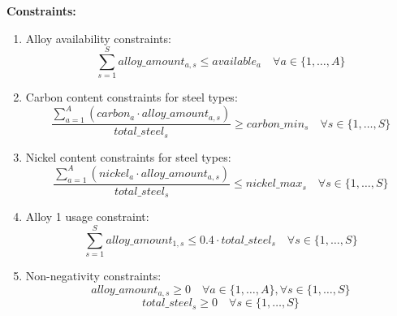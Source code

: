 \documentclass{article}
\begin{document}
\textbf{Constraints:}
\begin{enumerate}
    \item Alloy availability constraints:
    \[
    \sum_{s=1}^{S} alloy\_amount_{a,s} \leq available_{a} \quad \forall a \in \{1,\ldots,A\}
    \]
    
    \item Carbon content constraints for steel types:
    \[
    \frac{\sum_{a=1}^{A} (carbon_{a} \cdot alloy\_amount_{a,s})}{total\_steel_{s}} \geq carbon\_min_{s} \quad \forall s \in \{1,\ldots,S\}
    \]

    \item Nickel content constraints for steel types:
    \[
    \frac{\sum_{a=1}^{A} (nickel_{a} \cdot alloy\_amount_{a,s})}{total\_steel_{s}} \leq nickel\_max_{s} \quad \forall s \in \{1,\ldots,S\}
    \]

    \item Alloy 1 usage constraint:
    \[
    \sum_{s=1}^{S} alloy\_amount_{1,s} \leq 0.4 \cdot total\_steel_{s} \quad \forall s \in \{1,\ldots,S\}
    \]

    \item Non-negativity constraints:
    \[
    alloy\_amount_{a,s} \geq 0 \quad \forall a \in \{1,\ldots,A\}, \forall s \in \{1,\ldots,S\}
    \]
    \[
    total\_steel_{s} \geq 0 \quad \forall s \in \{1,\ldots,S\}
    \]
\end{enumerate}
\end{document}
